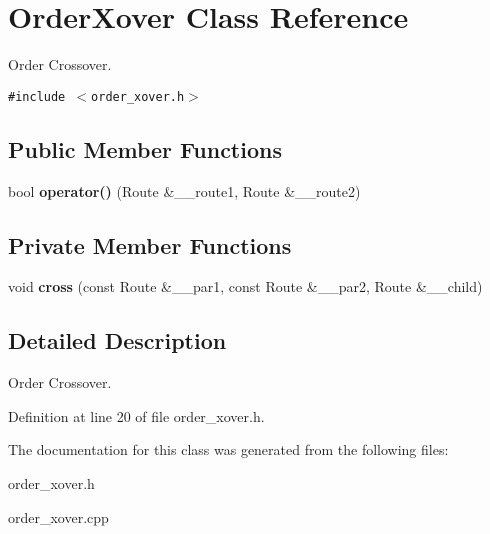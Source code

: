 \section{OrderXover Class Reference}
\label{class_order_xover}
Order Crossover.  


{\tt \#include $<$order\_\-xover.h$>$}

\subsection*{Public Member Functions}
\begin{CompactItemize}
\item 
bool {\bf operator()} (Route \&\_\-\_\-route1, Route \&\_\-\_\-route2)\label{class_order_xover_0ff6aada669eb8173322ed68cda1ac61}

\end{CompactItemize}
\subsection*{Private Member Functions}
\begin{CompactItemize}
\item 
void {\bf cross} (const Route \&\_\-\_\-par1, const Route \&\_\-\_\-par2, Route \&\_\-\_\-child)\label{class_order_xover_d2bf90b5f46ac4a344777e17bc5f364d}

\end{CompactItemize}


\subsection{Detailed Description}
Order Crossover. 



Definition at line 20 of file order\_\-xover.h.

The documentation for this class was generated from the following files:\begin{CompactItemize}
\item 
order\_\-xover.h\item 
order\_\-xover.cpp\end{CompactItemize}
